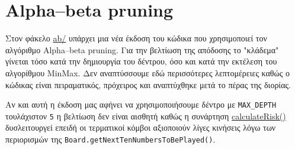 \chapter{Alpha–beta pruning}
Στον φάκελο \url{ab/} υπάρχει μια νέα έκδοση του κώδικα που χρησιμοποιεί τον αλγόριθμο Alpha–beta pruning\cite{ab-pruning}.
Για την βελτίωση της απόδοσης το "κλάδεμα" γίνεται τόσο κατά την δημιουργία του δέντρου, όσο και κατά την εκτέλεση του αλγορίθμου MinMax.
Δεν αναπτύσσουμε εδώ περισσότερες λεπτομέρειες καθώς ο κώδικας είναι πειραματικός, πρόχειρος και αναπτύχθηκε μετά το πέρας της διορίας.

Αν και αυτή η έκδοση μας αφήνει να χρησιμοποιήσουμε δέντρο με \lstinline!MAX_DEPTH! τουλάχιστον \lstinline!5! η βελτίωση δεν είναι αισθητή καθώς η συνάρτηση
\hyperref[fun:calculateRisk]{calculateRisk()} δυσλειτουργεί επειδή οι τερματικοί κόμβοι αξιοποιούν λίγες κινήσεις λόγω των περιορισμών της
\lstinline!Board.getNextTenNumbersToBePlayed()!.

